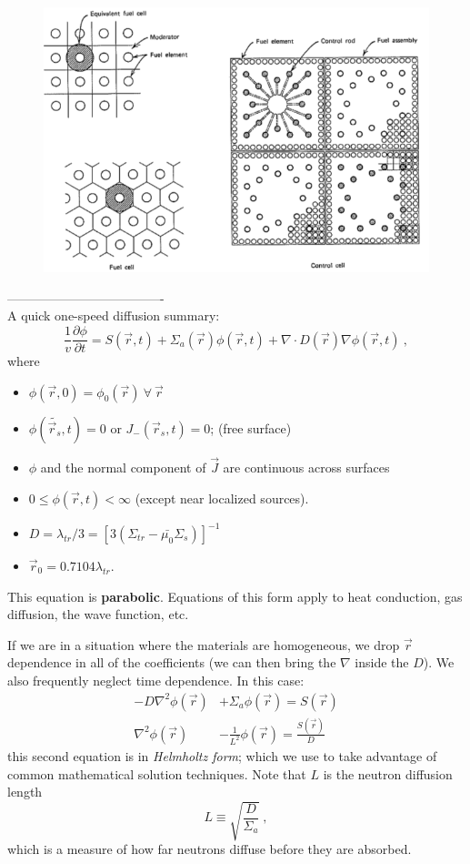 \documentclass[12pt]{article}
\newcommand{\rvec}{\ensuremath{\vec{r}}}
\begin{document}
\begin{figure}
    \begin{center}
    \includegraphics[keepaspectratio, width = 5 in]{../figs/unit-cell}
    \end{center}
    \label{fig:phase_space}
\end{figure}

-------------------------------------\\
A quick one-speed diffusion summary:
\[\frac{1}{v} \frac{\partial \phi}{\partial t} = S(\rvec, t) + \Sigma_a(\rvec) \phi(\rvec, t) + \nabla \cdot D(\rvec) \nabla \phi(\rvec, t)\:,\]
where
\begin{itemize}
\item $\phi(\rvec, 0) = \phi_0(\rvec) \: \forall \: \rvec$
\item $\phi(\tilde{\rvec_s}, t) = 0$ or $J_-(\rvec_s, t) = 0$; (free surface)
\item $\phi$ and the normal component of $\vec{J}$ are continuous across surfaces
\item $0 \leq \phi(\rvec, t) < \infty$ (except near localized sources).
\item $D = \lambda_{tr}/3 = [3(\Sigma_{tr} - \bar{\mu_0}\Sigma_s)]^{-1}$
\item $\rvec_0 = 0.7104 \lambda_{tr}$.
\end{itemize}
This equation is \textbf{parabolic}. Equations of this form apply to heat conduction, gas diffusion, the wave function, etc.

If we are in a situation where the materials are homogeneous, we drop $\rvec$ dependence in all of the coefficients (we can then bring the $\nabla$ inside the $D$). 
We also frequently neglect time dependence. 
In this case:
%
\begin{align*}
-D \nabla^2 \phi(\rvec) &+ \Sigma_a \phi(\rvec) = S(\rvec) \\
\nabla^2 \phi(\rvec) &- \frac{1}{L^2}\phi(\rvec) = \frac{S(\rvec)}{D}
\end{align*}
this second equation is in \textit{Helmholtz form}; which we use to take advantage of common mathematical solution techniques.
Note that $L$ is the neutron diffusion length
\[L \equiv \sqrt{\frac{D}{\Sigma_a}}\:,\]
which is a measure of how far neutrons diffuse before they are absorbed.
\end{document}
